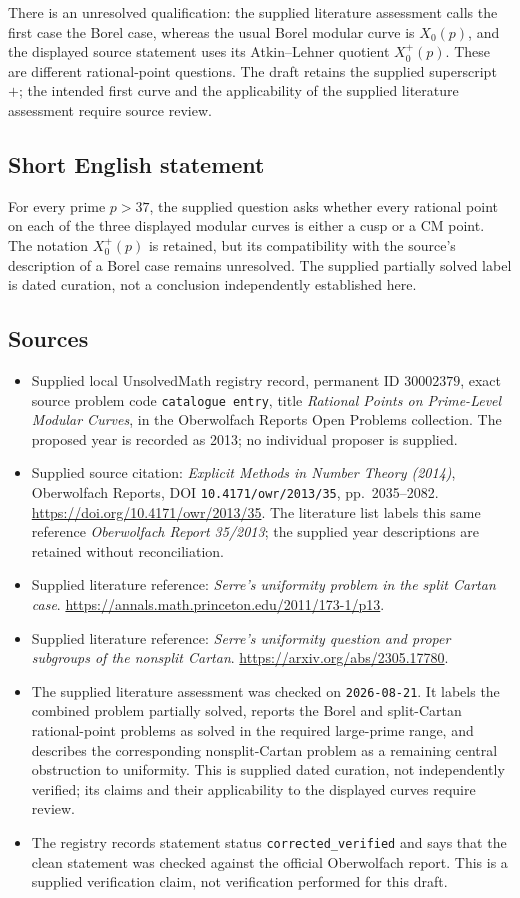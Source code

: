 \documentclass[11pt]{article}
\begin{document}
There is an unresolved qualification: the supplied literature assessment calls the first case the Borel case, whereas the usual Borel modular curve is \(X_0(p)\), and the displayed source statement uses its Atkin--Lehner quotient \(X_0^+(p)\). These are different rational-point questions. The draft retains the supplied superscript \(+\); the intended first curve and the applicability of the supplied literature assessment require source review.
\subsection{Short English statement}
For every prime \(p>37\), the supplied question asks whether every rational point on each of the three displayed modular curves is either a cusp or a CM point. The notation \(X_0^+(p)\) is retained, but its compatibility with the source's description of a Borel case remains unresolved. The supplied partially solved label is dated curation, not a conclusion independently established here.
\subsection{Sources}
\begin{itemize}
\item Supplied local UnsolvedMath registry record, permanent ID \(30002379\), exact source problem code \texttt{catalogue entry}, title \emph{Rational Points on Prime-Level Modular Curves}, in the Oberwolfach Reports Open Problems collection. The proposed year is recorded as 2013; no individual proposer is supplied.
\item Supplied source citation: \emph{Explicit Methods in Number Theory (2014)}, Oberwolfach Reports, DOI \texttt{10.4171/owr/2013/35}, pp.\ 2035--2082. \url{https://doi.org/10.4171/owr/2013/35}. The literature list labels this same reference \emph{Oberwolfach Report 35/2013}; the supplied year descriptions are retained without reconciliation.
\item Supplied literature reference: \emph{Serre's uniformity problem in the split Cartan case}. \url{https://annals.math.princeton.edu/2011/173-1/p13}.
\item Supplied literature reference: \emph{Serre's uniformity question and proper subgroups of the nonsplit Cartan}. \url{https://arxiv.org/abs/2305.17780}.
\item The supplied literature assessment was checked on \texttt{2026-08-21}. It labels the combined problem partially solved, reports the Borel and split-Cartan rational-point problems as solved in the required large-prime range, and describes the corresponding nonsplit-Cartan problem as a remaining central obstruction to uniformity. This is supplied dated curation, not independently verified; its claims and their applicability to the displayed curves require review.
\item The registry records statement status \texttt{corrected\_verified} and says that the clean statement was checked against the official Oberwolfach report. This is a supplied verification claim, not verification performed for this draft.
\end{itemize}
\end{document}

